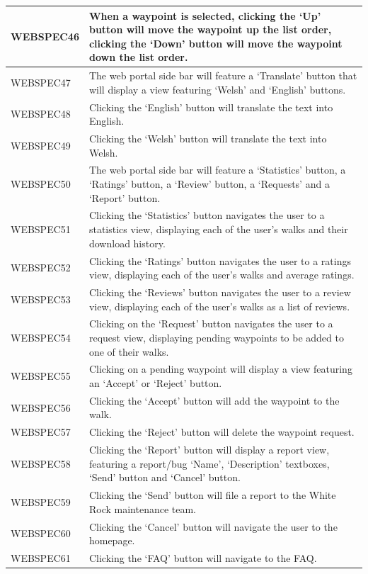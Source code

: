 \documentclass[11pt,a4paper]{article}
\begin{document}
\begin{longtable}{|p{2.5cm}p{13cm}|}
WEBSPEC46 & When a waypoint is selected, clicking the `Up' button will move the waypoint up the list order, clicking the `Down' button will move the waypoint down the list order. \\ \hline
WEBSPEC47 & The web portal side bar will feature a `Translate' button that will display a view featuring `Welsh' and `English' buttons. \\ \hline
WEBSPEC48 & Clicking the `English' button will translate the text into English. \\ \hline
WEBSPEC49 & Clicking the `Welsh' button will translate the text into Welsh. \\ \hline
WEBSPEC50 & The web portal side bar will feature a `Statistics' button, a `Ratings' button, a `Review' button, a `Requests' and a `Report' button. \\ \hline
WEBSPEC51 & Clicking the `Statistics' button navigates the user to a statistics view, displaying each of the user's walks and their download history. \\ \hline
WEBSPEC52 & Clicking the `Ratings' button navigates the user to a ratings view, displaying each of the user's walks and average ratings. \\ \hline
WEBSPEC53 & Clicking the `Reviews' button navigates the user to a review view, displaying each of the user's walks as a list of reviews. \\ \hline
WEBSPEC54 & Clicking on the `Request' button navigates the user to a request view, displaying pending waypoints to be added to one of their walks. \\ \hline
WEBSPEC55 & Clicking on a pending waypoint will display a view featuring an `Accept' or `Reject' button. \\ \hline
WEBSPEC56 & Clicking the `Accept' button will add the waypoint to the walk. \\ \hline
WEBSPEC57 & Clicking the `Reject' button will delete the waypoint request. \\ \hline
WEBSPEC58 & Clicking the `Report' button will display a report view, featuring a report/bug `Name', `Description' textboxes, `Send' button and `Cancel' button. \\ \hline
WEBSPEC59 & Clicking the `Send' button will file a report to the White Rock maintenance team. \\ \hline
WEBSPEC60 & Clicking the `Cancel' button will navigate the user to the homepage. \\ \hline
WEBSPEC61 & Clicking the `FAQ' button will navigate to the FAQ. \\ \hline

\end{longtable}
\end{document}
